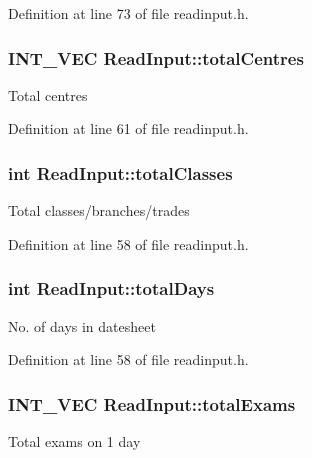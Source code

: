 Definition at line 73 of file readinput.\-h.

\hypertarget{classReadInput_ae6732644e5c3efd46f562493351c9820}{
\subsubsection[{total\-Centres}]{\setlength{\rightskip}{0pt plus 5cm}I\-N\-T\-\_\-\-V\-E\-C Read\-Input\-::total\-Centres\hspace{0.3cm}{\ttfamily [protected]}}}\label{classReadInput_ae6732644e5c3efd46f562493351c9820}
Total centres 

Definition at line 61 of file readinput.\-h.

\hypertarget{classReadInput_a32d11288922cc26708b20324ae7b7a77}{
\subsubsection[{total\-Classes}]{\setlength{\rightskip}{0pt plus 5cm}int Read\-Input\-::total\-Classes\hspace{0.3cm}{\ttfamily [protected]}}}\label{classReadInput_a32d11288922cc26708b20324ae7b7a77}
Total classes/branches/trades 

Definition at line 58 of file readinput.\-h.

\hypertarget{classReadInput_a40dc15f03ab1d4c998aa48f2a7176574}{
\subsubsection[{total\-Days}]{\setlength{\rightskip}{0pt plus 5cm}int Read\-Input\-::total\-Days\hspace{0.3cm}{\ttfamily [protected]}}}\label{classReadInput_a40dc15f03ab1d4c998aa48f2a7176574}
No. of days in datesheet 

Definition at line 58 of file readinput.\-h.

\hypertarget{classReadInput_aa5fd69afc1c76686f37bcb20805ba551}{
\subsubsection[{total\-Exams}]{\setlength{\rightskip}{0pt plus 5cm}I\-N\-T\-\_\-\-V\-E\-C Read\-Input\-::total\-Exams\hspace{0.3cm}{\ttfamily [protected]}}}\label{classReadInput_aa5fd69afc1c76686f37bcb20805ba551}
Total exams on 1 day 

